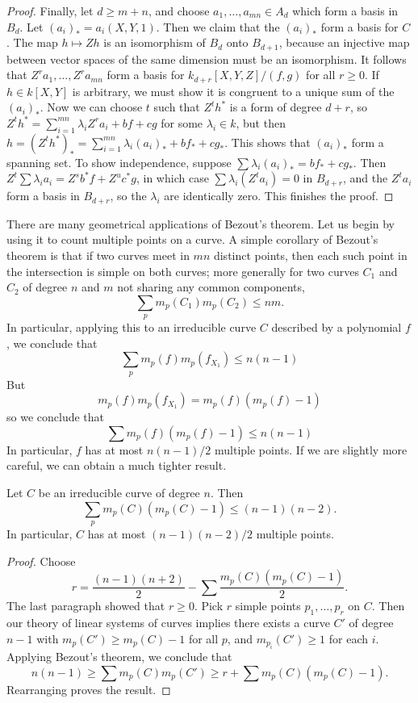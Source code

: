 \begin{proof}
    Finally, let $d \geq m + n$, and choose $a_1, \dots, a_{mn} \in A_d$ which form a basis in $B_d$. Let $(a_i)_* = a_i(X,Y,1)$. Then we claim that the $(a_i)_*$ form a basis for $C$. The map $h \mapsto Zh$ is an isomorphism of $B_d$ onto $B_{d+1}$, because an injective map between vector spaces of the same dimension must be an isomorphism. It follows that $Z^ra_1, \dots, Z^ra_{mn}$ form a basis for $k_{d+r}[X,Y,Z]/(f,g)$ for all $r \geq 0$. If $h \in k[X,Y]$ is arbitrary, we must show it is congruent to a unique sum of the $(a_i)_*$. Now we can choose $t$ such that $Z^th^*$ is a form of degree $d + r$, so $Z^th^* = \sum_{i = 1}^{mn} \lambda_i Z^ra_i + bf + cg$ for some $\lambda_i \in k$, but then $h = (Z^th^*)_* = \sum_{i = 1}^{mn} \lambda_i (a_i)_* + bf_* + cg_*$. This shows that $(a_i)_*$ form a spanning set. To show independence, suppose $\sum \lambda_i (a_i)_* = bf_* + cg_*$. Then $Z^t \sum \lambda_i a_i = Z^s b^*f + Z^u c^*g$, in which case $\sum \lambda_i (Z^t a_i) = 0$ in $B_{d+r}$, and the $Z^ta_i$ form a basis in $B_{d+r}$, so the $\lambda_i$ are identically zero. This finishes the proof.
\end{proof}

There are many geometrical applications of Bezout's theorem. Let us begin by using it to count multiple points on a curve. A simple corollary of Bezout's theorem is that if two curves meet in $mn$ distinct points, then each such point in the intersection is simple on both curves; more generally for two curves $C_1$ and $C_2$ of degree $n$ and $m$ not sharing any common components,
%
\[ \sum_p m_p(C_1) m_p(C_2) \leq nm. \]
%
In particular, applying this to an irreducible curve $C$ described by a polynomial $f$, we conclude that
%
\[ \sum_p m_p(f) m_p(f_{X_1}) \leq n(n-1) \]
%
But
%
\[ m_p(f) m_p(f_{X_1}) = m_p(f) (m_p(f) - 1) \]
%
so we conclude that
%
\[ \sum m_p(f) (m_p(f) - 1) \leq n(n-1) \]
%
In particular, $f$ has at most $n(n-1)/2$ multiple points. If we are slightly more careful, we can obtain a much tighter result.

\begin{theorem}
    Let $C$ be an irreducible curve of degree $n$. Then
    \[ \sum_p m_p(C) (m_p(C) - 1) \leq (n-1)(n-2). \]
    In particular, $C$ has at most $(n-1)(n-2)/2$ multiple points.
\end{theorem}
\begin{proof}
    Choose
    \[ r = \frac{(n-1)(n+2)}{2} - \sum \frac{m_p(C) (m_p(C) - 1)}{2}. \]
    The last paragraph showed that $r \geq 0$. Pick $r$ simple points $p_1,\dots,p_r$ on $C$. Then our theory of linear systems of curves implies there exists a curve $C'$ of degree $n-1$ with $m_p(C') \geq m_p(C) - 1$ for all $p$, and $m_{p_i}(C') \geq 1$ for each $i$. Applying Bezout's theorem, we conclude that
    \[ n(n-1) \geq \sum m_p(C) m_p(C') \geq r + \sum m_p(C) (m_p(C) - 1). \]
    Rearranging proves the result.
\end{proof}

